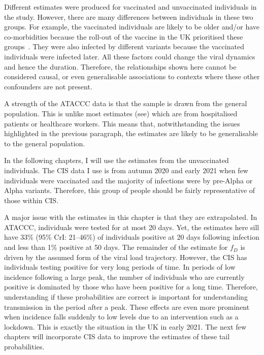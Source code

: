 \documentclass[thesis.tex]{subfiles}
\begin{document}
Different estimates were produced for vaccinated and unvaccinated individuals in the study.
However, there are many differences between individuals in these two groups.
For example, the vaccinated individuals are likely to be older and/or have co-morbidities because the roll-out of the vaccine in the UK prioritised these groups~\autocite{naoCovidVaccination}.
They were also infected by different variants because the vaccinated individuals were infected later.
All these factors could change the viral dynamics~\autocite{russellWithinhost} and hence the duration.
Therefore, the relationships shown here cannot be considered causal, or even generalisable associations to contexts where these other confounders are not present.

A strength of the ATACCC data is that the sample is drawn from the general population.
This is unlike most estimates (see) which are from hospitalised patients or healthcare workers.
This means that, notwithstanding the issues highlighted in the previous paragraph, the estimates are likely to be generalisable to the general population.

In the following chapters, I will use the estimates from the unvaccinated individuals.
The CIS data I use is from autumn 2020 and early 2021 when few individuals were vaccinated and the majority of infections were by pre-Alpha or Alpha variants.
Therefore, this group of people should be fairly representative of those within CIS.

A major issue with the estimates in this chapter is that they are extrapolated.
In ATACCC, individuals were tested for at most 20 days.
Yet, the estimates here sill have 33\% (95\% CrI: 21--46\%) of individuals positive at 20 days following infection and less than 1\% positive at 50 days.
The remainder of the estimate for $f_D$ is driven by the assumed form of the viral load trajectory.
However, the CIS has individuals testing positive for very long periods of time.
In periods of low incidence following a large peak, the number of individuals who are currently positive is dominated by those who have been positive for a long time.
Therefore, understanding if these probabilities are correct is important for understanding transmission in the period after a peak.
These effects are even more prominent when incidence falls suddenly to low levels due to an intervention such as a lockdown.
This is exactly the situation in the UK in early 2021.
The next few chapters will incorporate CIS data to improve the estimates of these tail probabilities.

\ifSubfilesClassLoaded{
  \appendix
  
  
  \listoftodos
}{}
\end{document}

